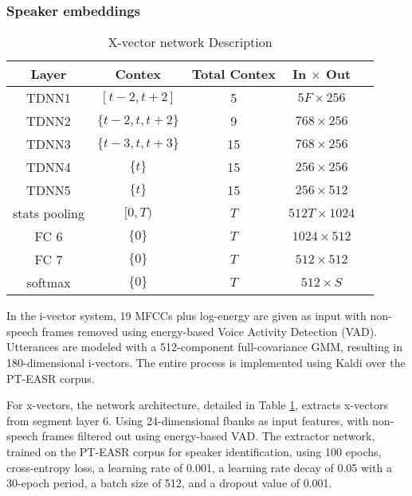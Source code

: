 \subsubsection{Speaker embeddings}
\begin{table}[h]
  \centering
  \begin{tabular}{ccccc}
  \hline
  Layer & Contex & Total Contex & In $\times$ Out \\
  \hline
  TDNN1 & $[t-2, t+2]$ & 5 & $5F \times 256$ & \\
  TDNN2 & $\{t-2, t, t+2\}$ & 9 & $768 \times 256$ & \\
  TDNN3 & $\{t-3, t, t+3\}$ & 15 & $768 \times 256$ & \\
  TDNN4 & $\{t\}$ & 15 & $256 \times 256$ & \\
  TDNN5 & $\{t\}$ & 15 & $256 \times 512$ & \\
  stats pooling & $[0, T)$ & $T$ & $512T \times 1024$ & \\
  FC 6 & $\{0\}$ & $T$ & $1024 \times 512$ & \\
  FC 7 & $\{0\}$ & $T$ & $512 \times 512$ & \\
  softmax & $\{0\}$ & $T$ & $512 \times S$ & \\
  \hline
  \end{tabular}
  \caption{X-vector network Description}
  \label{tab:xvect_description}
  \end{table}
  In the i-vector system, 19 MFCCs plus log-energy are given as input  with non-speech frames removed using energy-based Voice Activity Detection (VAD). Utterances are modeled with a 512-component full-covariance GMM, resulting in 180-dimensional i-vectors. The entire process is implemented using Kaldi \cite{kaldi} over the PT-EASR corpus.

  For x-vectors, the network architecture, detailed in Table \ref{tab:xvect_description}, extracts x-vectors from segment layer 6. Using 24-dimensional fbanks as input features, with non-speech frames filtered out using energy-based VAD. The extractor network, trained on the PT-EASR corpus for speaker identification, using 100 epochs, cross-entropy loss, a learning rate of 0.001, a learning rate decay of 0.05 with a 30-epoch period, a batch size of 512, and a dropout value of 0.001.

